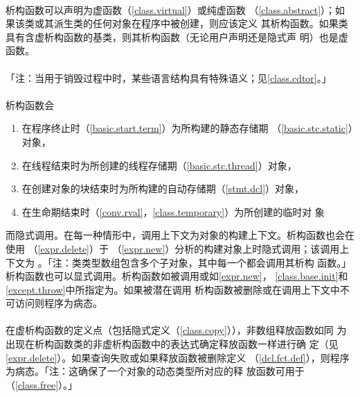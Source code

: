 \paragraph{}
析构函数可以声明为虚函数（\ref{class.virtual}）或纯虚函数
（\ref{class.abstract}）；如果该类或其派生类的任何对象在程序中被创建，则应该定义
其析构函数。如果类具有含虚析构函数的基类，则其析构函数（无论用户声明还是隐式声
明）也是虚函数。

\paragraph{}
「注：当用于销毁过程中时，某些语言结构具有特殊语义；见\ref{class.cdtor}。」

\paragraph{}
析构函数会
\begin{enumerate}
  \item{在程序终止时（\ref{basic.start.term}）为所构建的静态存储期
    （\ref{basic.stc.static}）对象，}
  \item{在线程结束时为所创建的线程存储期（\ref{basic.stc.thread}）对象，}
  \item{在创建对象的块结束时为所构建的自动存储期（\ref{stmt.dcl}）对象，}
  \item{在生命期结束时（\ref{conv.rval}，\ref{class.temporary}）为所创建的临时对
    象}
\end{enumerate}
而隐式调用。在每一种情形中，调用上下文为对象的构建上下文。析构函数也会在使用
（\ref{expr.delete}）于
（\ref{expr.new}）分析的构建对象上时隐式调用；该调用上下文为
。「注：类类型数组包含多个子对象，其中每一个都会调用其析构
函数。」析构函数也可以显式调用。析构函数如被调用或如\ref{expr.new}，
\ref{class.base.init}和\ref{except.throw}中所指定为。如果被潜在调用
析构函数被删除或在调用上下文中不可访问则程序为病态。

\paragraph{}
在虚析构函数的定义点（包括隐式定义（\ref{class.copy}）），非数组释放函数如同
为出现在析构函数类的非虚析构函数中的表达式确定释放函数一样进行确
定（见\ref{expr.delete}）。如果查询失败或如果释放函数被删除定义
（\ref{dcl.fct.def}），则程序为病态。「注：这确保了一个对象的动态类型所对应的释
放函数可用于（\ref{class.free}）。」

